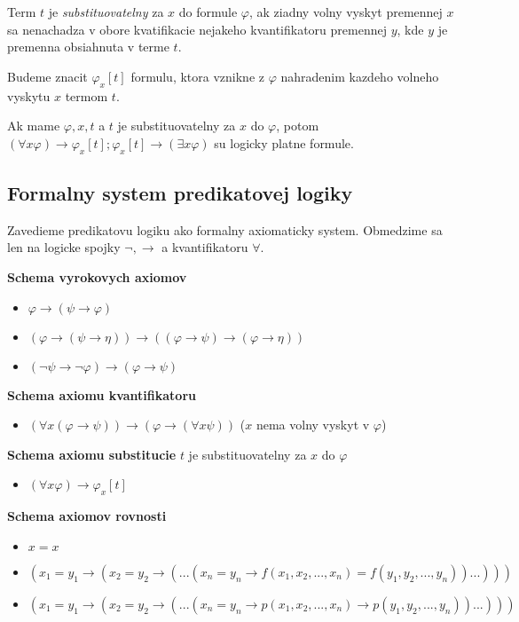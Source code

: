 \documentclass[12pt]{article}
\begin{document}
Term $t$ je \emph{substituovatelny} za $x$ do formule $\varphi$, ak ziadny volny vyskyt premennej
$x$ sa nenachadza v obore kvatifikacie nejakeho kvantifikatoru premennej $y$, kde $y$ je
premenna obsiahnuta v terme $t$.

Budeme znacit $\varphi_{x}[t]$ formulu, ktora vznikne z $\varphi$ nahradenim kazdeho volneho
vyskytu $x$ termom $t$.

Ak mame $\varphi, x, t$ a $t$ je substituovatelny za $x$ do $\varphi$, potom
$(\forall x \varphi) \to \varphi_{x}[t]; \varphi_{x}[t] \to (\exists x \varphi)$ su logicky
platne formule.

\subsection{Formalny system predikatovej logiky}
Zavedieme predikatovu logiku ako formalny axiomaticky system. Obmedzime sa len na logicke spojky
$\neg, \to$ a kvantifikatoru $\forall$.

\textbf{Schema vyrokovych axiomov}
\begin{itemize}
	\item $\varphi \to (\psi \to \varphi)$
	\item $(\varphi \to (\psi \to \eta)) \to ((\varphi \to \psi) \to (\varphi \to \eta))$
	\item $(\neg\psi \to \neg\varphi) \to (\varphi \to \psi)$
\end{itemize}
\textbf{Schema axiomu kvantifikatoru}
\begin{itemize}
	\item $(\forall x(\varphi \to \psi)) \to (\varphi \to (\forall x \psi))$
		($x$ nema volny vyskyt v $\varphi$)
\end{itemize}
\textbf{Schema axiomu substitucie}
$t$ je substituovatelny za $x$ do $\varphi$
\begin{itemize}
	\item $(\forall x \varphi) \to \varphi_{x}[t]$
\end{itemize}
\textbf{Schema axiomov rovnosti}
\begin{itemize}
	\item $x = x$
	\item $(x_{1} = y_{1} \to (x_{2} = y_{2} \to ( ... (x_{n} = y_{n} \to
		f(x_{1}, x_{2}, ..., x_{n}) = f(y_{1}, y_{2}, ..., y_{n}))...)))$
	\item $(x_{1} = y_{1} \to (x_{2} = y_{2} \to ( ... (x_{n} = y_{n} \to
		p(x_{1}, x_{2}, ..., x_{n}) \to p(y_{1}, y_{2}, ..., y_{n}))...)))$
\end{itemize}
\end{document}
